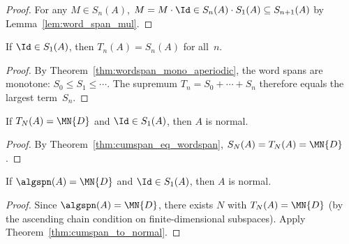 \begin{proof}\leanok{}
    For any $M \in S_n(A)$,
    $M = M \cdot \Id \in S_n(A) \cdot S_1(A) \subseteq S_{n+1}(A)$
    by Lemma~\ref{lem:word_span_mul}.
\end{proof}

\begin{theorem}%
    \label{thm:cumspan_eq_wordspan}
    \leanok
    If $\Id \in S_1(A)$, then
    $T_n(A) = S_n(A)$ for all~$n$.
\end{theorem}

\begin{proof}\leanok{}
    By Theorem~\ref{thm:wordspan_mono_aperiodic},
    the word spans are monotone: $S_0 \le S_1 \le \cdots$.
    The supremum $T_n = S_0 + \cdots + S_n$ therefore equals the
    largest term~$S_n$.
\end{proof}

\begin{theorem}%
    \label{thm:cumspan_to_normal}
    \leanok
    If $T_N(A) = \MN{D}$ and $\Id \in S_1(A)$, then $A$ is normal.
\end{theorem}

\begin{proof}\leanok{}
    By Theorem~\ref{thm:cumspan_eq_wordspan},
    $S_N(A) = T_N(A) = \MN{D}$.
\end{proof}

\begin{theorem}%
    \label{thm:algspan_to_normal}
    \leanok
    If $\algspn(A) = \MN{D}$ and $\Id \in S_1(A)$,
    then $A$ is normal.
\end{theorem}

\begin{proof}\leanok{}
    Since $\algspn(A) = \MN{D}$,
    there exists $N$ with $T_N(A) = \MN{D}$
    (by the ascending chain condition on finite-dimensional subspaces).
    Apply Theorem~\ref{thm:cumspan_to_normal}.
\end{proof}

